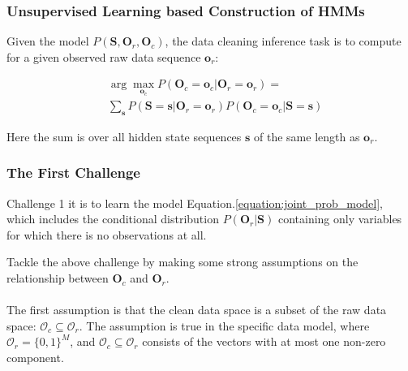 
\begin{frame}
\frametitle{Unsupervised Learning based Construction of HMMs}

Given the model $P(\mathbf{S}, \mathbf{O}_r, \mathbf{O}_c)$, the data cleaning inference task is to compute for a given observed raw data sequence $\mathbf{o}_r$: \pause

\begin{equation}
  \begin{split}
  & \arg\max\limits_{\mathbf{o}_c} P(\mathbf{O}_c = \mathbf{o}_c | \mathbf{O}_r = \mathbf{o}_r) = \\
  & \sum_{\mathbf{s}} P(\mathbf{S} = \mathbf{s} | \mathbf{O}_r = \mathbf{o}_r) P(\mathbf{O}_c = \mathbf{o}_c | \mathbf{S} = \mathbf{s})
  \end{split}\label{equation:inference_task}
\end{equation}

\pause

Here the sum is over all hidden state sequences $\mathbf{s}$ of the same length as $\mathbf{o}_r$.

\end{frame}


\begin{frame}
\frametitle{The First Challenge}

\begin{block}{Challenge 1}
  it is to learn the model Equation.\ref{equation:joint_prob_model}, which includes the conditional distribution $P(\mathbf{O}_r | \mathbf{S})$ containing only variables for which there is no observations at all.
\end{block}

\vspace{10pt}

Tackle the above challenge by making some strong assumptions on the relationship between $\mathbf{O}_c$ and $\mathbf{O}_r$. \\~\\

The first assumption is that the clean data space is a subset of the raw data space: $\mathcal{O}_c \subseteq \mathcal{O}_r$. The assumption is true in the specific data model, where $\mathcal{O}_r = \{ 0,1 \}^M$, and $\mathcal{O}_c \subseteq \mathcal{O}_r$ consists of the vectors with at most one non-zero component.


\end{frame}

